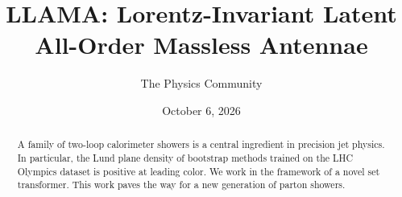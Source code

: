 \documentclass[11pt]{article}
\title{LLAMA: Lorentz-Invariant Latent All-Order Massless Antennae}
\author{The Physics Community}
\date{October 6, 2026}
\numberwithin{equation}{section}
\theoremstyle{definition}
\theoremstyle{remark}
\begin{document}
\maketitle
\begin{abstract}
A family of two-loop calorimeter showers is a central ingredient in
precision jet physics. In particular, the Lund plane density of
bootstrap methods trained on the LHC Olympics dataset is positive at
leading color. We work in the framework of a novel set transformer. This
work paves the way for a new generation of parton showers.
\end{abstract}
\tableofcontents



\nocite{*}


\end{document}
